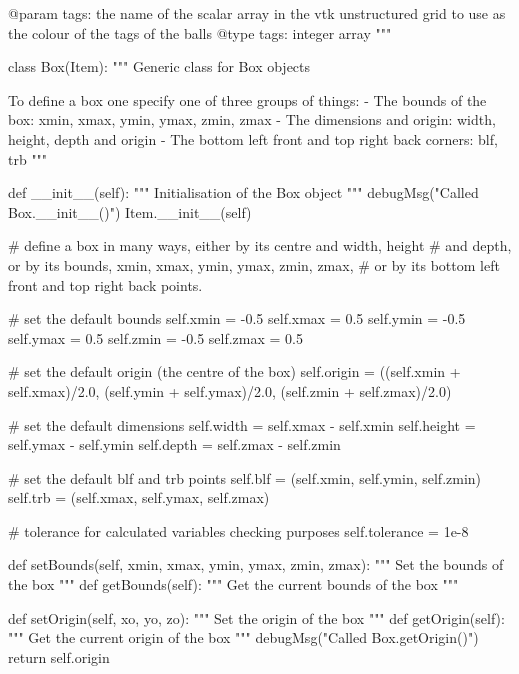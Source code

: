 \begin{python}
\begin{python}
\begin{verbose}
        @param tags: the name of the scalar array in the vtk unstructured
        grid to use as the colour of the tags of the balls
        @type tags: integer array
        """

class Box(Item):
    """
    Generic class for Box objects

    To define a box one specify one of three groups of things:
      - The bounds of the box: xmin, xmax, ymin, ymax, zmin, zmax
      - The dimensions and origin: width, height, depth and origin
      - The bottom left front and top right back corners: blf, trb
    """

    def __init__(self):
        """
        Initialisation of the Box object
        """
        debugMsg("Called Box.__init__()")
        Item.__init__(self)

        # define a box in many ways, either by its centre and width, height
        # and depth, or by its bounds, xmin, xmax, ymin, ymax, zmin, zmax,
        # or by its bottom left front and top right back points.

        # set the default bounds
        self.xmin = -0.5
        self.xmax = 0.5
        self.ymin = -0.5
        self.ymax = 0.5
        self.zmin = -0.5
        self.zmax = 0.5

        # set the default origin (the centre of the box)
        self.origin = ((self.xmin + self.xmax)/2.0, 
                (self.ymin + self.ymax)/2.0, 
                (self.zmin + self.zmax)/2.0)

        # set the default dimensions
        self.width = self.xmax - self.xmin
        self.height = self.ymax - self.ymin
        self.depth = self.zmax - self.zmin

        # set the default blf and trb points
        self.blf = (self.xmin, self.ymin, self.zmin)
        self.trb = (self.xmax, self.ymax, self.zmax)

        # tolerance for calculated variables checking purposes
        self.tolerance = 1e-8

    def setBounds(self, xmin, xmax, ymin, ymax, zmin, zmax):
        """
        Set the bounds of the box
        """
    def getBounds(self):
        """
        Get the current bounds of the box
        """

    def setOrigin(self, xo, yo, zo):
        """
        Set the origin of the box
        """
    def getOrigin(self):
        """
        Get the current origin of the box
        """
        debugMsg("Called Box.getOrigin()")
        return self.origin


\end{verbose}
\end{python}
\end{python}
